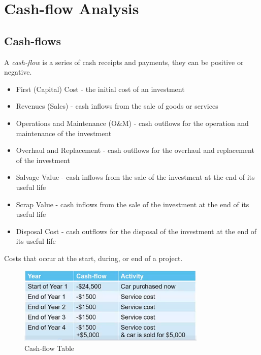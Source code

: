 \chapter{Cash-flow Analysis}

\section{Cash-flows}
\begin{definition}
    A \textit{cash-flow} is a series of cash receipts and payments, they can be positive or negative.
\end{definition}
\begin{itemize}
    \item First (Capital) Cost - the initial cost of an investment
    \item Revenues (Sales) - cash inflows from the sale of goods or services
    \item Operations and Maintenance (O\&M) - cash outflows for the operation and maintenance of the investment
    \item Overhaul and Replacement - cash outflows for the overhaul and replacement of the investment
    \item Salvage Value - cash inflows from the sale of the investment at the end of its useful life
    \item Scrap Value - cash inflows from the sale of the investment at the end of its useful life
    \item Disposal Cost - cash outflows for the disposal of the investment at the end of its useful life
\end{itemize}

\begin{definition}
    Costs that occur at the start, during, or end of a project.
\end{definition}

\begin{figure}[H]
    \centering
    \includegraphics[width=0.8\textwidth]{LECTURE_2/cash-flow_table.png}
    \caption{Cash-flow Table}
    \label{fig:cash-flow_table}
\end{figure}

